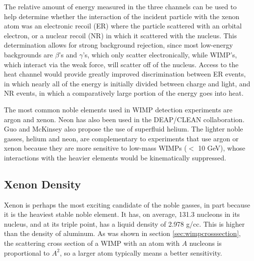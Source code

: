 The relative amount of energy measured in the three channels can be used to help determine whether the interaction of the incident particle with the xenon atom was an electronic recoil (ER) where the particle scattered with an orbital electron, or a nuclear recoil (NR) in which it scattered with the nucleus. This determination allows for strong background rejection, since most low-energy backgrounds are $\beta$'s and $\gamma$'s, which only scatter electronically, while WIMP's, which interact via the weak force, will scatter off of the nucleus. Access to the heat channel would provide greatly improved discrimination between ER events, in which nearly all of the energy is initially divided between charge and light, and NR events, in which a comparatively large portion of the energy goes into heat.

The most common noble elements used in WIMP detection experiments are argon and xenon. Neon has also been used in the DEAP/CLEAN collaboration\cite{clean1,clean2}. Guo and McKinsey also propose the use of superfluid helium\cite{he_dm}. The lighter noble gasses, helium and neon, are complementary to experiments that use argon or xenon because they are more sensitive to low-mass WIMPs ($<$ 10 GeV), whose interactions with the heavier elements would be kinematically suppressed.

\subsection{Xenon Density}
Xenon is perhaps the most exciting candidate of the noble gasses, in part because it is the heaviest stable noble element. It has, on average, 131.3 nucleons in its nucleus, and at its triple point, has a liquid density of 2.978 g/cc. This is higher than the density of aluminum. As was shown in section \ref{sec:wimpcrosssection}, the scattering cross section of a WIMP with an atom with $A$ nucleons is proportional to $A^2$, so a larger atom typically means a better sensitivity. 

